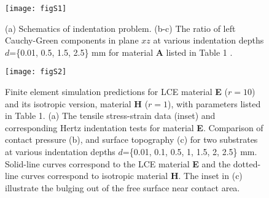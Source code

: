\documentclass[12pt]{article}
\begin{document}
\begin{figure}[h]
\begin{center}
  \texttt{[image: figS1]}
  \caption{(a) Schematics of indentation problem. (b-c) The ratio of left Cauchy-Green components in plane $xz$ at various indentation depths $d$=\{0.01, 0.5, 1.5, 2.5\} mm for material {\textbf A} listed in Table 1 .}
  \label{FIG.S1}
\end{center}
\end{figure}

\begin{figure}[h]
\begin{center}
  \texttt{[image: figS2]}
  \caption{Finite element simulation predictions for LCE material \textbf{E} ($r=10$) and its isotropic version, material \textbf{H} ($r=1$), with parameters listed in Table 1. (a) The tensile stress-strain data (inset) and corresponding Hertz indentation tests for material \textbf{E}. Comparison of contact pressure (b), and surface topography (c) for two substrates at various indentation depths $d$=\{0.01, 0.1, 0.5, 1, 1.5, 2, 2.5\} mm. Solid-line curves correspond to the LCE material \textbf{E} and the dotted-line curves correspond to isotropic material \textbf{H}. The inset in (c) illustrate the bulging out of the free surface near contact area.}
  \label{FIG.S2}
\end{center}
\end{figure}




 
\end{document}
